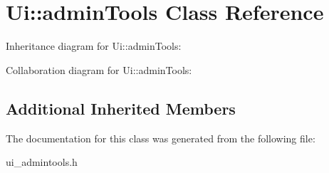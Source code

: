 \section{Ui\+:\+:admin\+Tools Class Reference}
\label{class_ui_1_1admin_tools}


Inheritance diagram for Ui\+:\+:admin\+Tools\+:


Collaboration diagram for Ui\+:\+:admin\+Tools\+:
\subsection*{Additional Inherited Members}


The documentation for this class was generated from the following file\+:\begin{DoxyCompactItemize}
\item 
ui\+\_\+admintools.\+h\end{DoxyCompactItemize}
